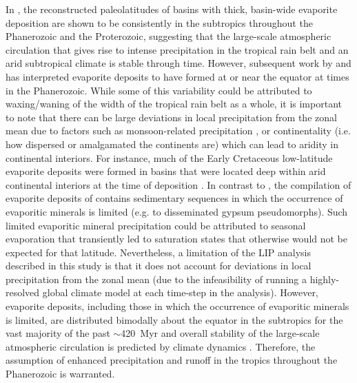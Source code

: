 In \citet{Evans2006a}, the reconstructed paleolatitudes of basins with thick, basin-wide evaporite deposition are shown to be consistently in the subtropics throughout the Phanerozoic and the Proterozoic, suggesting that the large-scale atmospheric circulation that gives rise to intense precipitation in the tropical rain belt and an arid subtropical climate is stable through time. However, subsequent work by \citet{Boucot2013a} and \citet{Cao2018a} has interpreted evaporite deposits to have formed at or near the equator at times in the Phanerozoic. While some of this variability could be attributed to waxing/waning of the width of the tropical rain belt as a whole, it is important to note that there can be large deviations in local precipitation from the zonal mean due to factors such as monsoon-related precipitation \citep{Trenberth2000a}, or continentality (i.e. how dispersed or amalgamated the continents are) which can lead to aridity in continental interiors. For instance, much of the Early Cretaceous low-latitude evaporite deposits were formed in basins that were located deep within arid continental interiors at the time of deposition \citep{Boucot2013a, Cao2018a}. In contrast to \citet{Evans2006a}, the compilation of evaporite deposits of \citet{Boucot2013a} contains sedimentary sequences in which the occurrence of evaporitic minerals is limited (e.g. to disseminated gypsum pseudomorphs). Such limited evaporitic mineral precipitation could be attributed to seasonal evaporation that transiently led to saturation states that otherwise would not be expected for that latitude. Nevertheless, a limitation of the LIP analysis described in this study is that it does not account for deviations in local precipitation from the zonal mean (due to the infeasibility of running a highly-resolved global climate model at each time-step in the analysis). However, evaporite deposits, including those in which the occurrence of evaporitic minerals is limited, are distributed bimodally about the equator in the subtropics for the vast majority of the past $\sim$420~Myr \citep{Cao2018a} and overall stability of the large-scale atmospheric circulation is predicted by climate dynamics \citep{Donohoe2017a}. Therefore, the assumption of enhanced precipitation and runoff in the tropics throughout the Phanerozoic is warranted.


